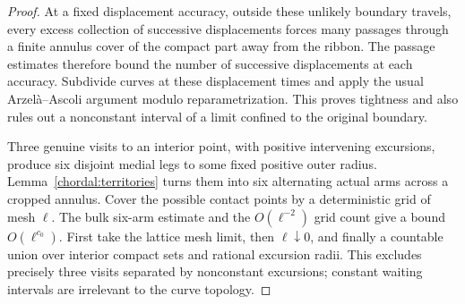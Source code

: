 \begin{proof}
At a fixed displacement accuracy, outside these unlikely boundary
travels, every excess collection of successive displacements forces
many passages through a finite annulus cover of the compact part
away from the ribbon.  The passage estimates therefore bound the
number of successive displacements at each accuracy.  Subdivide
curves at these displacement times and apply the usual
Arzel\`a--Ascoli argument modulo reparametrization.  This proves
tightness and also rules out a nonconstant interval of a limit
confined to the original boundary.

Three genuine visits to an interior point, with positive intervening
excursions, produce six disjoint medial legs to some fixed positive
outer radius.  Lemma~\ref{chordal:territories} turns them into six
alternating actual arms across a cropped annulus.  Cover the possible
contact points by a deterministic grid of mesh $\ell$.  The bulk
six-arm estimate and the $O(\ell^{-2})$ grid count give a bound
$O(\ell^{c_0})$.  First take the lattice mesh limit, then
$\ell\downarrow0$, and finally a countable union over interior
compact sets and rational excursion radii.  This excludes precisely
three visits separated by nonconstant excursions; constant waiting
intervals are irrelevant to the curve topology.
\end{proof}


